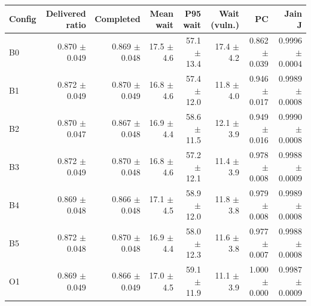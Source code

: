 \begin{tabular}{lrrrrrrr}
\hline
Config & Delivered ratio & Completed & Mean wait & P95 wait & Wait (vuln.) & PC & Jain J \\\hline
B0 & 0.870 $\pm$ 0.049 & 0.869 $\pm$ 0.048 & 17.5 $\pm$ 4.6 & 57.1 $\pm$ 13.4 & 17.4 $\pm$ 4.2 & 0.862 $\pm$ 0.039 & 0.9996 $\pm$ 0.0004 \\
B1 & 0.872 $\pm$ 0.049 & 0.870 $\pm$ 0.049 & 16.8 $\pm$ 4.6 & 57.4 $\pm$ 12.0 & 11.8 $\pm$ 4.0 & 0.946 $\pm$ 0.017 & 0.9989 $\pm$ 0.0008 \\
B2 & 0.870 $\pm$ 0.047 & 0.867 $\pm$ 0.048 & 16.9 $\pm$ 4.4 & 58.6 $\pm$ 11.5 & 12.1 $\pm$ 3.9 & 0.949 $\pm$ 0.016 & 0.9990 $\pm$ 0.0008 \\
B3 & 0.872 $\pm$ 0.049 & 0.870 $\pm$ 0.048 & 16.8 $\pm$ 4.6 & 57.2 $\pm$ 12.1 & 11.4 $\pm$ 3.9 & 0.978 $\pm$ 0.008 & 0.9988 $\pm$ 0.0009 \\
B4 & 0.869 $\pm$ 0.048 & 0.866 $\pm$ 0.048 & 17.1 $\pm$ 4.5 & 58.9 $\pm$ 12.0 & 11.8 $\pm$ 3.8 & 0.979 $\pm$ 0.008 & 0.9989 $\pm$ 0.0008 \\
B5 & 0.872 $\pm$ 0.048 & 0.870 $\pm$ 0.048 & 16.9 $\pm$ 4.4 & 58.0 $\pm$ 12.3 & 11.6 $\pm$ 3.8 & 0.977 $\pm$ 0.007 & 0.9988 $\pm$ 0.0008 \\
O1 & 0.869 $\pm$ 0.049 & 0.866 $\pm$ 0.049 & 17.0 $\pm$ 4.5 & 59.1 $\pm$ 11.9 & 11.1 $\pm$ 3.9 & 1.000 $\pm$ 0.000 & 0.9987 $\pm$ 0.0009 \\
\hline\end{tabular}
